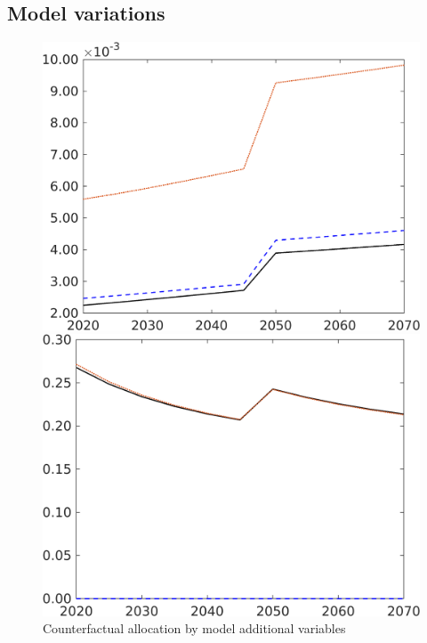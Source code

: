 \subsection{Model variations}
\begin{figure}[h!!]
	\centering
	\caption{Counterfactual allocation by model additional variables }\label{fig:count_mod_allo_app}

\begin{minipage}[]{0.32\textwidth}
	\includegraphics[width=1\textwidth]{../../codding_model/own_basedOnFried/optimalPol_190722_tidiedUp/figures/all_10Aout22/CountMod1_target_Lg_regime3_spillover0_sep1_extern0_etaa0.79_lgd0.png}
\end{minipage}	\begin{minipage}[]{0.32\textwidth}
		\includegraphics[width=1\textwidth]{../../codding_model/own_basedOnFried/optimalPol_190722_tidiedUp/figures/all_10Aout22/CountMod1_target_sg_regime3_spillover0_sep1_extern0_etaa0.79_lgd0.png}

\end{minipage}
\end{figure}
